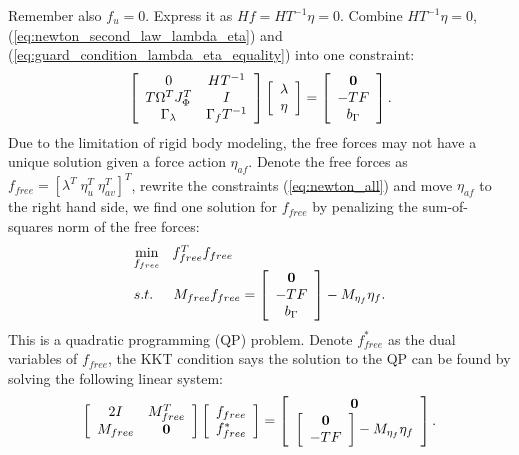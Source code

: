 %
Remember also $f_u=0$. Express it as $Hf=HT^{-1}\eta=0$. Combine $HT^{-1}\eta=0$, (\ref{eq:newton_second_law_lambda_eta}) and (\ref{eq:guard_condition_lambda_eta_equality}) into one constraint:
\begin{equation}
  \label{eq:newton_all}
  \left[ {\begin{array}{*{20}{c}}{{0}}&{{H}{T^{ - 1}}}\\{T{\Omega ^T}J_\Phi ^T}&I\\\Gamma_\lambda&\Gamma_fT^{-1}\end{array}} \right]\left[ {\begin{array}{*{20}{c}}\lambda \\\eta \end{array}} \right] = \left[ {\begin{array}{*{20}{c}}{\bf{0}}\\{ - TF}\\b_\Gamma\end{array}} \right].
\end{equation}
Due to the limitation of rigid body modeling, the free forces may not have a unique solution given a force action $\eta_{af}$. Denote the free forces as $f_{free} = [\lambda^T\; \eta_u^T\; \eta_{av}^T]^T$, rewrite the constraints (\ref{eq:newton_all}) and move $\eta_{af}$ to the right hand side, we find one solution for $f_{free}$ by penalizing the sum-of-squares norm of the free forces:
\begin{equation}
  \label{eq:QP_newton_law}
  \begin{array}{l}\mathop {\min }\limits_{f_{free}} \;\;\,f_{free}^Tf_{free}\\s.t.\;\;\,\;\;\,{M_{free}}f_{free} = \left[ {\begin{array}{*{20}{c}}
  {\bf{0}}\\{ - TF}\\b_\Gamma\end{array}} \right] - {M_{{\eta _f}}}{\eta _f}.\end{array}
\end{equation}
This is a quadratic programming (QP) problem. Denote $f^*_{free}$ as the dual variables of $f_{free}$, the KKT condition says the solution to the QP can be found by solving the following linear system:
\begin{equation}
  \label{eq:KKT}
  \left[ {\begin{array}{*{20}{c}}{2I}&{M_{free}^T}\\{{M_{free}}}&{\bf 0}\end{array}} \right]\left[ {\begin{array}{*{20}{c}}f_{free}\\f_{free}^*\end{array}} \right] = \left[ {\begin{array}{*{20}{c}}{\bf 0}\\{\left[ {\begin{array}{*{20}{c}}{\bf{0}}\\{ - TF}\end{array}} \right] - {M_{{\eta _f}}}{\eta _f}}\end{array}} \right].
\end{equation}
